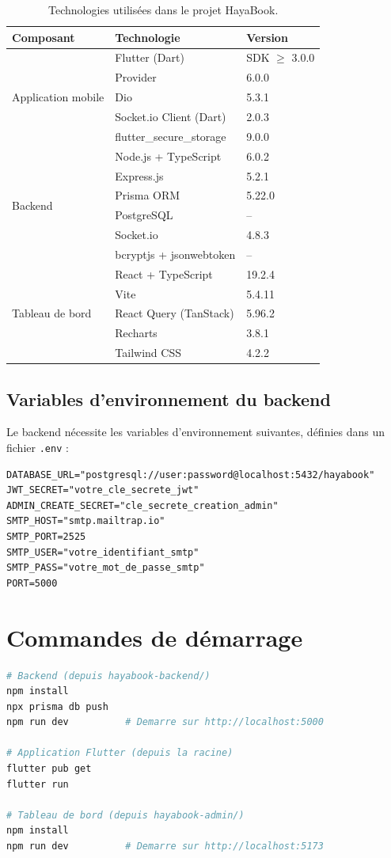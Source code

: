 \begin{table}[h]
\centering
\caption{Technologies utilisées dans le projet HayaBook.}
\label{tab:tech}
\begin{tabular}{|l|l|l|}
\hline
\textbf{Composant} & \textbf{Technologie} & \textbf{Version} \\
\hline
\multirow{5}{*}{Application mobile} & Flutter (Dart) & SDK $\geq$ 3.0.0 \\
 & Provider & 6.0.0 \\
 & Dio & 5.3.1 \\
 & Socket.io Client (Dart) & 2.0.3 \\
 & flutter\_secure\_storage & 9.0.0 \\
\hline
\multirow{6}{*}{Backend} & Node.js + TypeScript & 6.0.2 \\
 & Express.js & 5.2.1 \\
 & Prisma ORM & 5.22.0 \\
 & PostgreSQL & -- \\
 & Socket.io & 4.8.3 \\
 & bcryptjs + jsonwebtoken & -- \\
\hline
\multirow{5}{*}{Tableau de bord} & React + TypeScript & 19.2.4 \\
 & Vite & 5.4.11 \\
 & React Query (TanStack) & 5.96.2 \\
 & Recharts & 3.8.1 \\
 & Tailwind CSS & 4.2.2 \\
\hline
\end{tabular}
\end{table}

\subsection{Variables d'environnement du backend}

Le backend nécessite les variables d'environnement suivantes, définies dans un fichier \texttt{.env} :

\begin{lstlisting}[caption={Variables d'environnement du backend HayaBook (.env)}]
DATABASE_URL="postgresql://user:password@localhost:5432/hayabook"
JWT_SECRET="votre_cle_secrete_jwt"
ADMIN_CREATE_SECRET="cle_secrete_creation_admin"
SMTP_HOST="smtp.mailtrap.io"
SMTP_PORT=2525
SMTP_USER="votre_identifiant_smtp"
SMTP_PASS="votre_mot_de_passe_smtp"
PORT=5000
\end{lstlisting}

\section{Commandes de démarrage}

\begin{lstlisting}[language=bash, caption={Commandes pour démarrer les différents composants}]
# Backend (depuis hayabook-backend/)
npm install
npx prisma db push
npm run dev          # Demarre sur http://localhost:5000

# Application Flutter (depuis la racine)
flutter pub get
flutter run

# Tableau de bord (depuis hayabook-admin/)
npm install
npm run dev          # Demarre sur http://localhost:5173
\end{lstlisting}